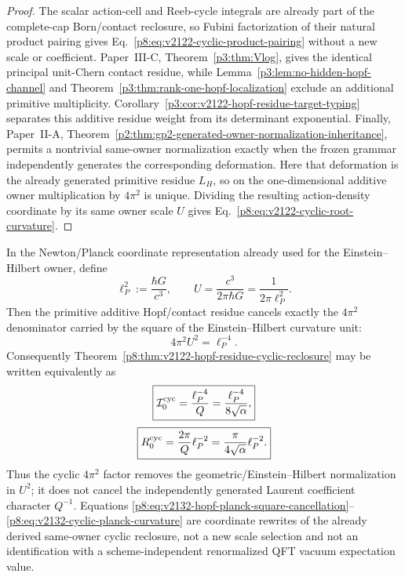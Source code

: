 \documentclass[12pt,a4paper]{article}
\begin{document}
\begin{proof}
The scalar action-cell and Reeb-cycle integrals are already part of the
complete-cap Born/contact reclosure, so Fubini factorization of their natural
product pairing gives Eq.~\eqref{p8:eq:v2122-cyclic-product-pairing} without a
new scale or coefficient.  Paper~III-C,
Theorem~\ref{p3:thm:Vlog}, gives the identical principal unit-Chern contact
residue, while Lemma~\ref{p3:lem:no-hidden-hopf-channel} and
Theorem~\ref{p3:thm:rank-one-hopf-localization} exclude an additional primitive
multiplicity.  Corollary~\ref{p3:cor:v2122-hopf-residue-target-typing} separates
this additive residue weight from its determinant exponential.  Finally,
Paper~II-A, Theorem~\ref{p2:thm:gp2-generated-owner-normalization-inheritance},
permits a nontrivial same-owner normalization exactly when the frozen grammar
independently generates the corresponding deformation.  Here that deformation
is the already generated primitive residue \(L_H\), so on the one-dimensional
additive owner multiplication by \(4\pi^2\) is unique.  Dividing the resulting
action-density coordinate by its same owner scale \(U\) gives
Eq.~\eqref{p8:eq:v2122-cyclic-root-curvature}.
\end{proof}

\begin{corollary}
\label{p8:cor:v2132-cyclic-planck-square-normalization}
In the Newton/Planck coordinate representation already used for the
Einstein--Hilbert owner, define
\[
 \ell_P^2:=\frac{\hbar G}{c^3},
 \qquad
 U=\frac{c^3}{2\pi\hbar G}=\frac{1}{2\pi\ell_P^2}.
\]
Then the primitive additive Hopf/contact residue cancels exactly the
\(4\pi^2\) denominator carried by the square of the Einstein--Hilbert
curvature unit:
\begin{equation}
\label{p8:eq:v2132-hopf-planck-square-cancellation}
 \boxed{4\pi^2U^2=\ell_P^{-4}.}
\end{equation}
Consequently Theorem~\ref{p8:thm:v2122-hopf-residue-cyclic-reclosure} may be
written equivalently as
\begin{equation}
\label{p8:eq:v2132-cyclic-planck-action-density}
 \boxed{
 \mathcal I_0^{\rm cyc}
 =\frac{\ell_P^{-4}}{Q}
 =\frac{\ell_P^{-4}}{8\sqrt\alpha},}
\end{equation}
\begin{equation}
\label{p8:eq:v2132-cyclic-planck-curvature}
 \boxed{
 R_0^{\rm cyc}
 =\frac{2\pi}{Q}\ell_P^{-2}
 =\frac{\pi}{4\sqrt\alpha}\ell_P^{-2}.}
\end{equation}
Thus the cyclic \(4\pi^2\) factor removes the geometric/Einstein--Hilbert
normalization in \(U^2\); it does not cancel the independently generated
Laurent coefficient character \(Q^{-1}\).  Equations
\eqref{p8:eq:v2132-hopf-planck-square-cancellation}--
\eqref{p8:eq:v2132-cyclic-planck-curvature} are coordinate rewrites of the
already derived same-owner cyclic reclosure, not a new scale selection and
not an identification with a scheme-independent renormalized QFT vacuum
expectation value.
\end{corollary}
\end{document}
